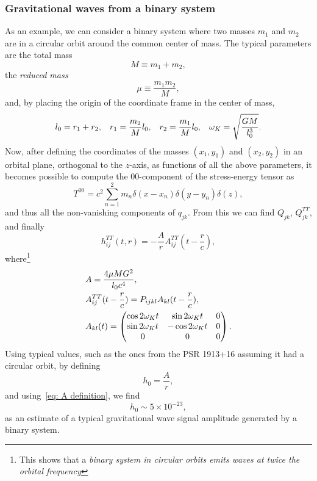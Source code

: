 \subsubsection{Gravitational waves from a binary system}
As an example, we can consider a binary system where two masses $m_1$ and $m_2$ are in a circular orbit around the common center of mass.
The typical parameters are the total mass
\[
    M\equiv m_1+m_2,
\]
the \textit{reduced mass}
\[
    \mu\equiv \frac{m_1m_2}{M},
\]
and, by placing the origin of the coordinate frame in the center of mass, 
\[
    l_0 = r_1+r_2, \hspace{3mm} r_1=\frac{m_2}{M}l_0, \hspace{3mm} r_2=\frac{m_1}{M}l_0, \hspace{3mm} \omega_K=\sqrt{ \frac{GM}{l_0^3}}.
\]
Now, after defining the coordinates of the masses $(x_1,y_1)$ and $(x_2,y_2)$ in an orbital plane, orthogonal to the $z$-axis, as functions of all the above parameters, it becomes possible to compute the 00-component of the stress-energy tensor as
\[
T^{00}=c^2\sum^2_{n=1}m_n\delta(x-x_n)\delta(y-y_n)\delta(z),
\]
and thus all the non-vanishing components of $q_{jk}$.
From this we can find $Q_{jk}$, $Q_{jk}^{TT}$, and finally
\begin{equation}
    h_{ij}^{TT}(t,r) = -\frac{A}{r}A_{ij}^{TT}(t-\frac{r}{c}),
    \label{eq: binary system general strain solution}
\end{equation}
where\footnote{This shows that a \textit{binary system in circular orbits emits waves at twice the orbital frequency}} 
\begin{align}
    & A=\frac{4\mu MG^2}{l_0c^4}, \notag\\
    & A_{ij}^{TT}(t-\frac{r}{c}) = P_{ijkl}A_{kl}(t-\frac{r}{c}),\notag\\ 
    \vspace{2mm}
    &    A_{kl}(t) =  
    \begin{pmatrix}
        \cos{2\omega_Kt} & \sin{2\omega_Kt} & 0 \\
     \sin{2\omega_Kt} &  -\cos{2\omega_Kt}& 0 \\
     0 & 0 & 0 \\
    \end{pmatrix}.
    \label{eq: A definition}
\end{align}
Using typical values, such as the ones from the PSR 1913+16 assuming it had a circular orbit, by defining 
\[
    h_0=\frac{A}{r},
\]
and using~\eqref{eq: A definition}, we find  
\begin{equation}
    h_0\sim 5\times10^{-23}, 
    \label{eq: typical strain amplitude value}
\end{equation}
as an estimate of a typical gravitational wave signal amplitude generated by a binary system.

